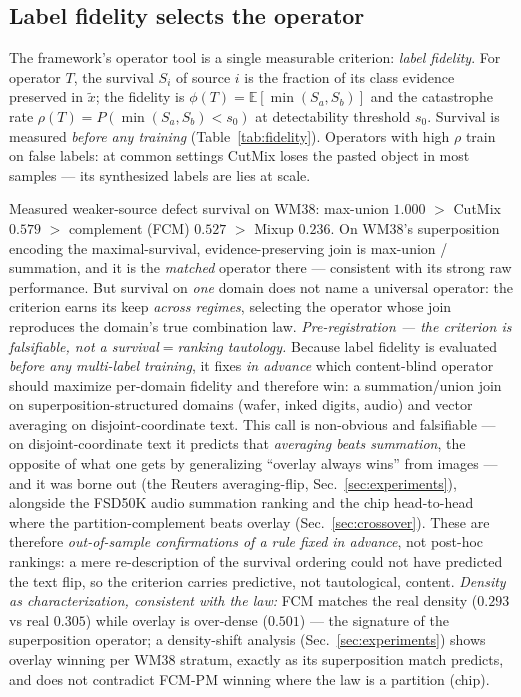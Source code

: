 \documentclass[11pt]{article}
\begin{document}
\subsection{Label fidelity selects the operator}

The framework's operator tool is a single measurable criterion: \emph{label
fidelity}. For operator $T$, the survival $S_i$ of source $i$ is the fraction of its
class evidence preserved in $\tilde{x}$; the fidelity is
$\phi(T) = \mathbb{E}[\min(S_a, S_b)]$ and the catastrophe rate
$\rho(T) = P(\min(S_a,S_b) < s_0)$ at detectability threshold $s_0$. Survival is
measured \emph{before any training} (Table~\ref{tab:fidelity}). Operators with high
$\rho$ train on false labels: at common settings CutMix loses the pasted object in
most samples --- its synthesized labels are lies at scale.

Measured weaker-source defect survival on WM38: max-union $1.000$ $>$ CutMix $0.579$
$>$ complement (FCM) $0.527$ $>$ Mixup $0.236$. On WM38's superposition encoding the
maximal-survival, evidence-preserving join is max-union / summation, and it is the
\emph{matched} operator there --- consistent with its strong raw performance. But
survival on \emph{one} domain does not name a universal operator: the criterion earns
its keep \emph{across regimes}, selecting the operator whose join reproduces the
domain's true combination law. \emph{Pre-registration --- the criterion is falsifiable,
not a survival${=}$ranking tautology.} Because label fidelity is evaluated \emph{before
any multi-label training}, it fixes \emph{in advance} which content-blind operator
should maximize per-domain fidelity and therefore win: a summation/union join on
superposition-structured domains (wafer, inked digits, audio) and vector averaging on
disjoint-coordinate text. This call is non-obvious and falsifiable --- on
disjoint-coordinate text it predicts that \emph{averaging beats summation}, the opposite
of what one gets by generalizing ``overlay always wins'' from images --- and it was
borne out (the Reuters averaging-flip, Sec.~\ref{sec:experiments}), alongside the FSD50K
audio summation ranking and the chip head-to-head where the partition-complement beats
overlay (Sec.~\ref{sec:crossover}). These are therefore \emph{out-of-sample confirmations
of a rule fixed in advance}, not post-hoc rankings: a mere re-description of the survival
ordering could not have predicted the text flip, so the criterion carries predictive, not
tautological, content.
\emph{Density as characterization, consistent with the law:} FCM matches the real
density ($0.293$ vs real $0.305$) while overlay is over-dense ($0.501$) --- the
signature of the superposition operator; a density-shift analysis
(Sec.~\ref{sec:experiments}) shows overlay winning per WM38 stratum, exactly as its
superposition match predicts, and does not contradict FCM-PM winning where the law is a
partition (chip).
\end{document}
